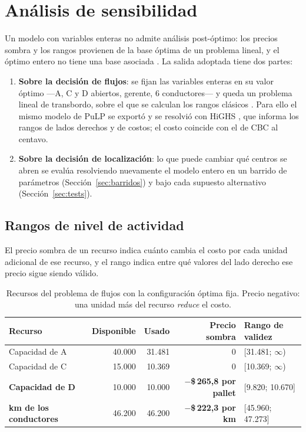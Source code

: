 \documentclass[10pt,a4paper]{article}
\newcommand{\cuello}[1]{\textbf{\textcolor{limita}{#1}}}
\begin{document}
\section{Análisis de sensibilidad}
\label{sec:sensibilidad}

Un modelo con variables enteras no admite análisis post-óptimo: los precios
sombra y los rangos provienen de la base óptima de un problema lineal, y el
óptimo entero no tiene una base asociada \cite{catedra-mip}. La salida
adoptada tiene dos partes:

\begin{enumerate}
  \item \textbf{Sobre la decisión de flujos}: se fijan las variables enteras
  en su valor óptimo —A, C y D abiertos, gerente, 6 conductores— y queda un
  problema lineal de transbordo, sobre el que se calculan los rangos clásicos
  \cite{catedra-sens}. Para ello el mismo modelo de PuLP se exportó y se
  resolvió con HiGHS \cite{highs}, que informa los rangos de lados derechos y
  de costos; el costo coincide con el de CBC al centavo.
  \item \textbf{Sobre la decisión de localización}: lo que puede cambiar qué
  centros se abren se evalúa resolviendo nuevamente el modelo entero en un
  barrido de parámetros (Sección~\ref{sec:barridos}) y bajo cada supuesto
  alternativo (Sección~\ref{sec:tests}).
\end{enumerate}

\subsection{Rangos de nivel de actividad}
\label{sec:b1}

El precio sombra de un recurso indica cuánto cambia el costo por cada unidad
adicional de ese recurso, y el rango indica entre qué valores del lado derecho
ese precio sigue siendo válido.

\begin{table}[H]
\centering\small
\caption{Recursos del problema de flujos con la configuración óptima fija.
Precio negativo: una unidad más del recurso \emph{reduce} el costo.}
\label{tab:rhs}
\begin{tabular}{lrrrl}
\toprule
\textbf{Recurso} & \textbf{Disponible} & \textbf{Usado} & \textbf{Precio sombra} & \textbf{Rango de validez} \\
\midrule
Capacidad de A                 & 40.000 & 31.481 & 0              & [31.481; $\infty$) \\
Capacidad de C                 & 15.000 & 10.369 & 0              & [10.369; $\infty$) \\
\cuello{Capacidad de D}        & 10.000 & 10.000 & \cuello{$-$\$\,265,8 por pallet} & [9.820; 10.670] \\
\cuello{km de los conductores} & 46.200 & 46.200 & \cuello{$-$\$\,222,3 por km}     & [45.960; 47.273] \\
\bottomrule
\end{tabular}
\end{table}
\end{document}
